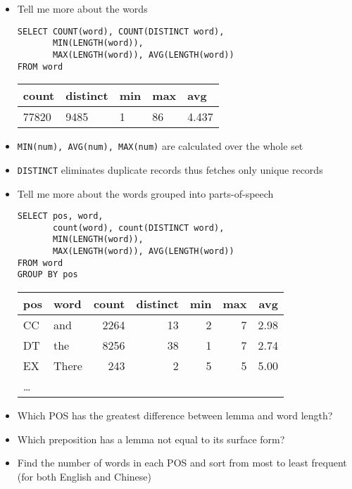 \documentclass[a4paper,landscape,headrule,footrule,xetex]{foils}
\begin{document}
\begin{itemize}
\item Tell me more about the words
\begin{verbatim}
SELECT COUNT(word), COUNT(DISTINCT word),
       MIN(LENGTH(word)), 
       MAX(LENGTH(word)), AVG(LENGTH(word))
FROM word
\end{verbatim}
  \begin{tabular}{lllll}
    \textbf{count}  & \textbf{distinct} &\textbf{min}  &  \textbf{max} & \textbf{avg} \\ \hline
    77820 & 9485 & 1 & 86 & 4.437
  \end{tabular}
\item  \texttt{MIN(num), AVG(num), MAX(num)} are calculated over the whole set
\item \texttt{DISTINCT} eliminates duplicate records thus fetches only unique records
\end{itemize}

\begin{itemize}
\item Tell me more about the words grouped into parts-of-speech
\begin{verbatim}
SELECT pos, word,
       count(word), count(DISTINCT word),
       MIN(LENGTH(word)), 
       MAX(LENGTH(word)), AVG(LENGTH(word))
FROM word
GROUP BY pos
\end{verbatim}
  \begin{tabular}{llrrrrr}
    \textbf{pos} & \textbf{word} & \textbf{count} & \textbf{distinct}  
  & \textbf{min}  &  \textbf{max} & \textbf{avg} \\ \hline
  CC & and  & 2264 & 13 & 2 & 7 & 2.98 \\
  DT & the  & 8256 & 38 & 1 & 7 & 2.74 \\
  EX & There&  243 &  2 & 5 & 5 & 5.00  \\
\ldots
  \end{tabular}
\end{itemize}



\begin{itemize}
\item Which POS has the greatest difference between lemma and word length?
\item Which preposition has a lemma not equal to its surface form?
\item Find the number of words in each POS and sort from most to least
  frequent (for both English and Chinese)
\end{itemize}
\end{document}
